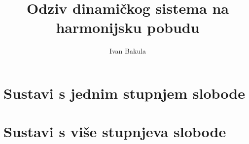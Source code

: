 \documentclass{rgn}
\author{Ivan Bakula}
\title{Odziv dinamičkog sistema na harmonijsku pobudu}
\begin{document}
\maketitle

\begin{titlepage}
    
\end{titlepage}

\frontmatter
\tableofcontents
\newpage
\listoftables
\newpage
\listoffigures
\newpage

\mainmatter
\chapter{Sustavi s jednim stupnjem slobode}
    
    \newpage
    
    \newpage
    
    
    \newpage
    
    \newpage
    
    \newpage
    
    \newpage
    
    \newpage
    
    \newpage
    
    \newpage
    
    \newpage
\chapter{Sustavi s više stupnjeva slobode}
    
    \newpage
    
    \newpage
    
    \newpage
    
    \newpage
    
    \newpage
    

\printbibliography[title=Popis literature]
\end{document}
